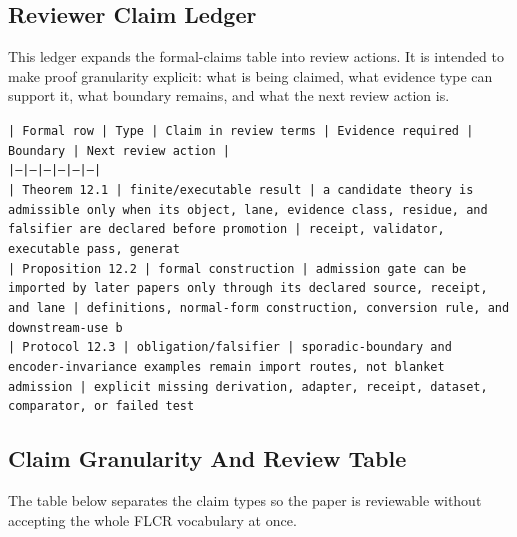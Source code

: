 \documentclass[11pt]{article}
\begin{document}
\subsection*{Reviewer Claim Ledger}

This ledger expands the formal-claims table into review actions. It is intended to make proof granularity explicit: what is being claimed, what evidence type can support it, what boundary remains, and what the next review action is.

\noindent\texttt{| Formal row | Type | Claim in review terms | Evidence required | Boundary | Next review action |}\\
\noindent\texttt{|---|---|---|---|---|---|}\\
\noindent\texttt{| Theorem 12.1 | finite/executable result | a candidate theory is admissible only when its object, lane, evidence class, residue, and falsifier are declared before promotion | receipt, validator, executable pass, generat}\\
\noindent\texttt{| Proposition 12.2 | formal construction | admission gate can be imported by later papers only through its declared source, receipt, and lane | definitions, normal-form construction, conversion rule, and downstream-use b}\\
\noindent\texttt{| Protocol 12.3 | obligation/falsifier | sporadic-boundary and encoder-invariance examples remain import routes, not blanket admission | explicit missing derivation, adapter, receipt, dataset, comparator, or failed test }\\

\subsection*{Claim Granularity And Review Table}

The table below separates the claim types so the paper is reviewable without accepting the whole FLCR vocabulary at once.
\end{document}

